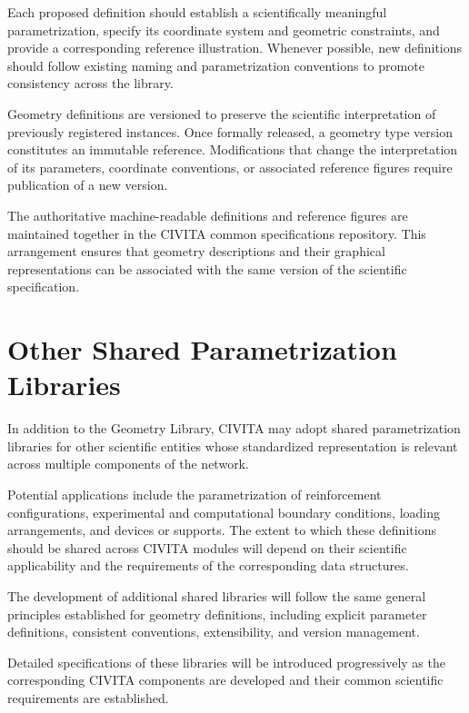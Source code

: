 Each proposed definition should establish a scientifically meaningful parametrization, specify its coordinate system and geometric constraints, and provide a corresponding reference illustration. Whenever possible, new definitions should follow existing naming and parametrization conventions to promote consistency across the library.

Geometry definitions are versioned to preserve the scientific interpretation of previously registered instances. Once formally released, a geometry type version constitutes an immutable reference. Modifications that change the interpretation of its parameters, coordinate conventions, or associated reference figures require publication of a new version.

The authoritative machine-readable definitions and reference figures are maintained together in the CIVITA common specifications repository. This arrangement ensures that geometry descriptions and their graphical representations can be associated with the same version of the scientific specification.

\section{Other Shared Parametrization Libraries}

In addition to the Geometry Library, CIVITA may adopt shared parametrization libraries for other scientific entities whose standardized representation is relevant across multiple components of the network.

Potential applications include the parametrization of reinforcement configurations, experimental and computational boundary conditions, loading arrangements, and devices or supports. The extent to which these definitions should be shared across CIVITA modules will depend on their scientific applicability and the requirements of the corresponding data structures.

The development of additional shared libraries will follow the same general principles established for geometry definitions, including explicit parameter definitions, consistent conventions, extensibility, and version management.

Detailed specifications of these libraries will be introduced progressively as the corresponding CIVITA components are developed and their common scientific requirements are established.
